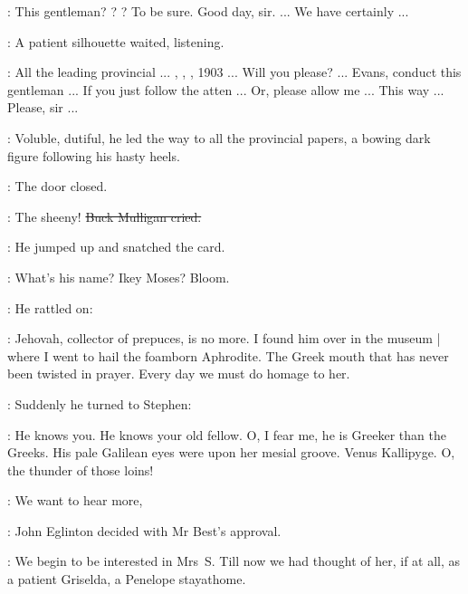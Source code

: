 \librarian:
This gentleman?
?
?
To be sure.
Good day,
sir.
 ...
We have certainly ...

:
A patient silhouette waited,
listening.

\librarian:
All the leading provincial ...
,
,
,
1903 ...
Will you please? ...
Evans,
conduct this gentleman ...
If you just follow the atten ...
Or, please allow me ...
This way ...
Please, sir ...

:
Voluble, dutiful,
he led the way to all the provincial papers,
a bowing dark figure following his hasty heels.

:
The door closed.

\mulligan:
The sheeny!
\sout{Buck Mulligan cried.}

:
He jumped up and snatched the card.

\mulligan:
What's his name?
Ikey Moses?
Bloom.

:
He rattled on:

\mulligan:
Jehovah,
collector of prepuces,
is no more.
I found him over in the museum |
where I went to hail the foamborn Aphrodite.
The Greek mouth that has never been twisted in prayer.
Every day we must do homage to her.

:
Suddenly he turned to Stephen:

\mulligan:
He knows you.
He knows your old fellow.
O, I fear me,
he is Greeker than the Greeks.
His pale Galilean eyes were upon her mesial groove.
Venus Kallipyge.
O, the thunder of those loins!

\eglinton:
We want to hear more,

:
John Eglinton decided with Mr Best's approval.

\eglinton:
We begin to be interested in Mrs~S\@.
Till now we had thought of her,
if at all,
as a patient Griselda,
a Penelope stayathome.

